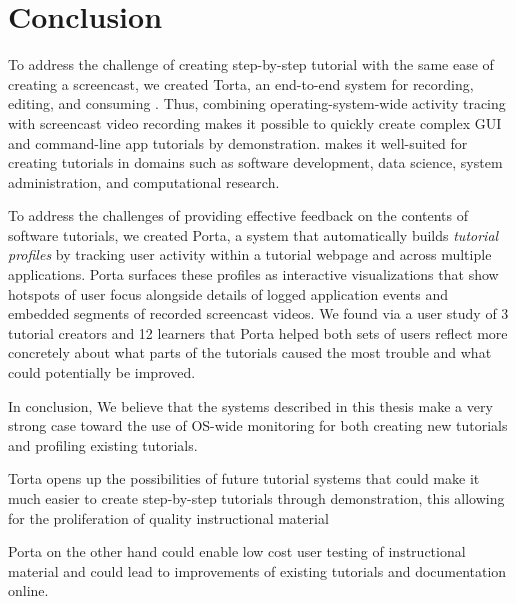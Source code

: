 \chapter{Conclusion}

% 
% 

To address the challenge of creating step-by-step tutorial with the same 
ease of creating a screencast, we created Torta, an end-to-end system 
for recording, editing, and consuming . Thus, combining operating-system-wide activity 
tracing with screencast video recording makes it possible to quickly create 
complex GUI and command-line app tutorials by demonstration.  makes it well-suited for creating
tutorials in domains such as software development, data science, system
administration, and computational research.

To address the challenges of providing effective feedback on
the contents of software tutorials, we created Porta, a system
that automatically builds \emph{tutorial profiles} by tracking user activity
within a tutorial webpage and across multiple applications.
Porta surfaces these profiles as interactive visualizations that show
hotspots of user focus alongside details of logged application events
and embedded segments of recorded screencast videos. We found via a user
study of 3 tutorial creators and 12 learners that Porta helped both sets
of users reflect more concretely about what parts of the tutorials
caused the most trouble and what could potentially be improved. 



In conclusion, We believe that the systems described in this thesis make a very strong case toward the use of OS-wide monitoring for both creating new tutorials and profiling existing tutorials. 

Torta opens up the possibilities of future tutorial systems that could make 
it much easier to create step-by-step tutorials through demonstration, this 
allowing for the proliferation of quality instructional material

Porta on the other hand could enable low cost user testing of 
instructional material and could lead to improvements of existing tutorials 
and documentation online.
